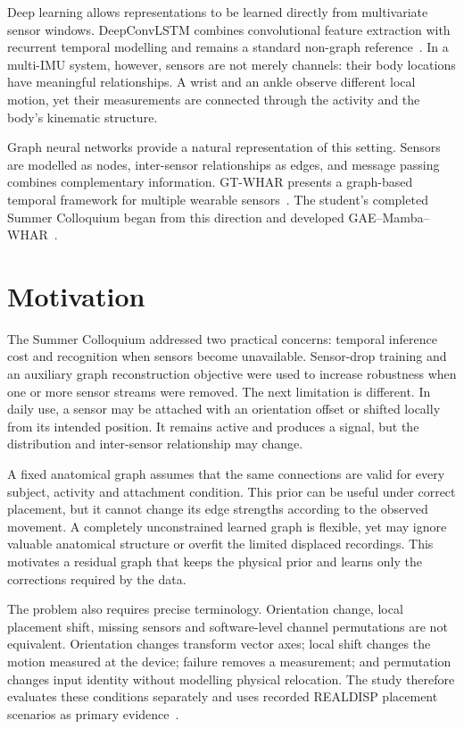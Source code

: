 \documentclass[12pt,a4paper,twoside,openright]{report}
\begin{document}
Deep learning allows representations to be learned directly from multivariate sensor windows. DeepConvLSTM combines convolutional feature extraction with recurrent temporal modelling and remains a standard non-graph reference~\cite{deepconvlstm}. In a multi-IMU system, however, sensors are not merely channels: their body locations have meaningful relationships. A wrist and an ankle observe different local motion, yet their measurements are connected through the activity and the body's kinematic structure.

Graph neural networks provide a natural representation of this setting. Sensors are modelled as nodes, inter-sensor relationships as edges, and message passing combines complementary information. GT-WHAR presents a graph-based temporal framework for multiple wearable sensors~\cite{gtwhar}. The student's completed Summer Colloquium began from this direction and developed GAE--Mamba--WHAR~\cite{summerreport}.

\section{Motivation}
The Summer Colloquium addressed two practical concerns: temporal inference cost and recognition when sensors become unavailable. Sensor-drop training and an auxiliary graph reconstruction objective were used to increase robustness when one or more sensor streams were removed. The next limitation is different. In daily use, a sensor may be attached with an orientation offset or shifted locally from its intended position. It remains active and produces a signal, but the distribution and inter-sensor relationship may change.

A fixed anatomical graph assumes that the same connections are valid for every subject, activity and attachment condition. This prior can be useful under correct placement, but it cannot change its edge strengths according to the observed movement. A completely unconstrained learned graph is flexible, yet may ignore valuable anatomical structure or overfit the limited displaced recordings. This motivates a residual graph that keeps the physical prior and learns only the corrections required by the data.

The problem also requires precise terminology. Orientation change, local placement shift, missing sensors and software-level channel permutations are not equivalent. Orientation changes transform vector axes; local shift changes the motion measured at the device; failure removes a measurement; and permutation changes input identity without modelling physical relocation. The study therefore evaluates these conditions separately and uses recorded REALDISP placement scenarios as primary evidence~\cite{banos,realdisp}.
\end{document}
